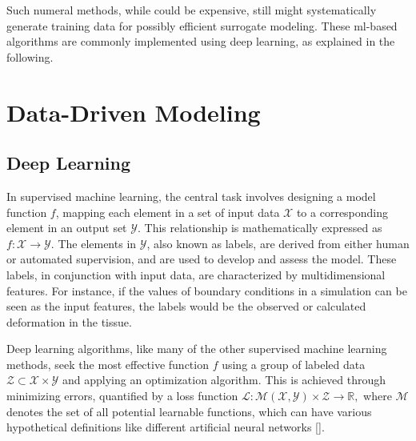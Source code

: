 \documentclass[12pt,a4paper]{report}
\begin{document}
Such numeral methods, while could be expensive, still might systematically generate training data for possibly efficient surrogate modeling. These \ac{ml}-based algorithms are commonly implemented using deep learning, as explained in the following.

\section{Data-Driven Modeling}
\subsection{Deep Learning}

In supervised machine learning, the central task involves designing a model function $f$, mapping each element in a set of input data $\mathcal{X}$ to a corresponding element in an output set $\mathcal{Y}$. This relationship is mathematically expressed as $f: \mathcal{X} \longrightarrow \mathcal{Y}.$ The elements in $\mathcal{Y}$, also known as labels, are derived from either human or automated supervision, and are used to develop and assess the model. These labels, in conjunction with input data, are characterized by multidimensional features. For instance, if the values of boundary conditions in a simulation can be seen as the input features, the labels would be the observed or calculated deformation in the tissue.

Deep learning algorithms, like many of the other supervised machine learning methods, seek the most effective function $f$ using a group of labeled data $\mathcal{Z}\subset \mathcal{X} \times \mathcal{Y}$ and applying an optimization algorithm. This is achieved through minimizing errors, quantified by a loss function $\mathcal{L}: \mathcal{M} \left ( \mathcal{X},\mathcal{Y} \right ) \times \mathcal{Z} \longrightarrow \mathbb{R},$ where $\mathcal{M}$ denotes the set of all potential learnable functions, which can have various hypothetical definitions like different artificial neural networks [\cite{abiodun2019}].
\end{document}
